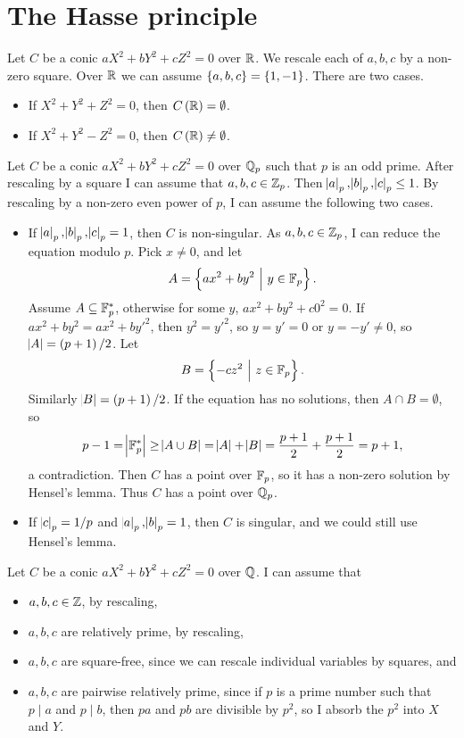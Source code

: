 \pagebreak

\section{The Hasse principle}


Let $ C $ be a conic $ aX^2 + bY^2 + cZ^2 = 0 $ over $ \mathbb{R} $. We rescale each of $ a, b, c $ by a non-zero square. Over $ \mathbb{R} $ we can assume $ \cbr{a, b, c} = \cbr{1, -1} $. There are two cases.
\begin{itemize}
\item If $ X^2 + Y^2 + Z^2 = 0 $, then $ C\br{\RR} = \emptyset $.
\item If $ X^2 + Y^2 - Z^2 = 0 $, then $ C\br{\RR} \ne \emptyset $.
\end{itemize}
Let $ C $ be a conic $ aX^2 + bY^2 + cZ^2 = 0 $ over $ \mathbb{Q}_p $ such that $ p $ is an odd prime. After rescaling by a square I can assume that $ a, b, c \in \mathbb{Z}_p $. Then $ \abs{a}_p, \abs{b}_p, \abs{c}_p \le 1 $. By rescaling by a non-zero even power of $ p $, I can assume the following two cases.
\begin{itemize}
\item If $ \abs{a}_p, \abs{b}_p, \abs{c}_p = 1 $, then $ C $ is non-singular. As $ a, b, c \in \mathbb{Z}_p $, I can reduce the equation modulo $ p $. Pick $ x \ne 0 $, and let
$$ A = \cbr{ax^2 + by^2 \st y \in \FF_p}. $$
Assume $ A \subseteq \mathbb{F}_p^* $, otherwise for some $ y $, $ ax^2 + by^2 + c0^2 = 0 $. If $ ax^2 + by^2 = ax^2 + by'^2 $, then $ y^2 = y'^2 $, so $ y = y' = 0 $ or $ y = -y' \ne 0 $, so $ \abs{A} = \br{p + 1} / 2 $. Let
$$ B = \cbr{-cz^2 \st z \in \FF_p}. $$
Similarly $ \abs{B} = \br{p + 1} / 2 $. If the equation has no solutions, then $ A \cap B = \emptyset $, so
$$ p - 1 = \abs{\mathbb{F}_p^*} \ge \abs{A \cup B} = \abs{A} + \abs{B} = \dfrac{p + 1}{2} + \dfrac{p + 1}{2} = p + 1, $$
a contradiction. Then $ C $ has a point over $ \mathbb{F}_p $, so it has a non-zero solution by Hensel's lemma. Thus $ C $ has a point over $ \mathbb{Q}_p $.
\item If $ \abs{c}_p = 1 / p $ and $ \abs{a}_p, \abs{b}_p = 1 $, then $ C $ is singular, and we could still use Hensel's lemma.
\end{itemize}
Let $ C $ be a conic $ aX^2 + bY^2 + cZ^2 = 0 $ over $ \mathbb{Q} $. I can assume that
\begin{itemize}
\item $ a, b, c \in \mathbb{Z} $, by rescaling,
\item $ a, b, c $ are relatively prime, by rescaling,
\item $ a, b, c $ are square-free, since we can rescale individual variables by squares, and
\item $ a, b, c $ are pairwise relatively prime, since if $ p $ is a prime number such that $ p \mid a $ and $ p \mid b $, then $ pa $ and $ pb $ are divisible by $ p^2 $, so I absorb the $ p^2 $ into $ X $ and $ Y $.
\end{itemize}

